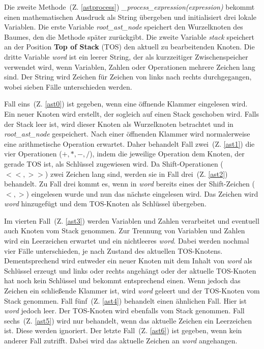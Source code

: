 Die zweite Methode~(Z. \ref{astprocess}) \textit{\_process\_expression(expression)} bekommt einen mathematischen Ausdruck als String übergeben und initialisiert drei lokale Variablen.
Die erste Variable \textit{root\_ast\_node} speichert den Wurzelknoten des Baumes, den die Methode später zurückgibt. Die zweite Variable \textit{stack} speichert an der 
Position \textbf{Top of Stack} (TOS) den aktuell zu bearbeitenden Knoten. Die dritte Variable \textit{word} ist ein leerer String, der als kurzzeitiger Zwischenspeicher verwendet wird,
wenn Variablen, Zahlen oder Operationen mehrere Zeichen lang sind.
Der String wird Zeichen für Zeichen von links nach rechts durchgegangen, wobei sieben Fälle unterschieden werden.

Fall eins~(Z. \ref{ast0}) ist gegeben, wenn eine öffnende Klammer eingelesen wird. Ein neuer Knoten wird erstellt, der sogleich auf einen Stack geschoben wird. Falls der Stack leer ist, wird
dieser Knoten als Wurzelknoten betrachtet und in \textit{root\_ast\_node} gespeichert.
Nach einer öffnenden Klammer wird normalerweise eine arithmetische Operation erwartet. 
Daher behandelt Fall zwei~(Z. \ref{ast1}) die vier Operationen ($+, *, -, /$), indem die jeweilige Operation dem Knoten, der gerade TOS ist,
als Schlüssel zugewiesen wird. Da Shift-Operationen ($<<, >>$) zwei Zeichen lang sind, werden sie in Fall drei~(Z. \ref{ast2}) behandelt.
Zu Fall drei kommt es, wenn in \textit{word} bereits eines der Shift-Zeichen ($<, >$) eingelesen wurde und nun das nächste eingelesen wird.
Das Zeichen wird \textit{word} hinzugefügt und dem TOS-Knoten als Schlüssel übergeben.

Im vierten Fall~(Z. \ref{ast3}) werden Variablen und Zahlen verarbeitet und eventuell auch Knoten vom Stack genommen.
Zur Trennung von Variablen und Zahlen wird ein Leerzeichen erwartet und ein nichtleeres \textit{word}.
Dabei werden nochmal vier Fälle unterschieden, je nach Zustand des aktuellen TOS-Knotens. Dementsprechend wird entweder ein neuer Knoten mit dem Inhalt von \textit{word} als Schlüssel
erzeugt und links oder rechts angehängt oder der aktuelle TOS-Knoten hat noch kein Schlüssel und bekommt entsprechend einen. 
Wenn jedoch das Zeichen ein schließende Klammer ist, wird \textit{word} geleert und der TOS-Knoten vom Stack genommen.
Fall fünf~(Z. \ref{ast4}) behandelt einen ähnlichen Fall. Hier ist \textit{word} jedoch leer. Der TOS-Knoten wird ebenfalls vom Stack genommen.
Fall sechs~(Z. \ref{ast5}) wird nur behandelt, wenn das aktuelle Zeichen ein Leerzeichen ist. Diese werden ignoriert.
Der letzte Fall~(Z. \ref{ast6}) ist gegeben, wenn kein anderer Fall zutrifft. Dabei wird das aktuelle Zeichen an \textit{word} angehangen.

